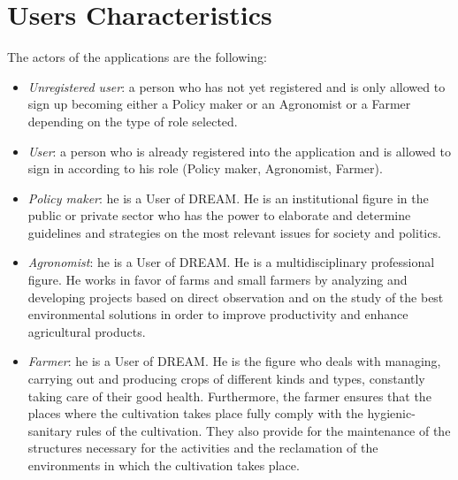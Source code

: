 \section{Users Characteristics}
The actors of the applications are the following:
\begin{itemize}
    \item \textit {Unregistered user}: a person who has not yet registered and is only allowed to sign up becoming either a Policy maker or an Agronomist or a Farmer depending on the type of role selected.
    \item \textit {User}: a person who is already registered into the application and is allowed to sign in according to his role (Policy maker, Agronomist, Farmer).
    \item \textit {Policy maker}: he is a User of DREAM. He is an institutional figure in the public or private sector who has the power to elaborate and determine guidelines and strategies on the most relevant issues for society and politics. 
    \item \textit {Agronomist}: he is a User of DREAM. He is a multidisciplinary professional figure. He works in favor of farms and small farmers by analyzing and developing projects based on direct observation and on the study of the best environmental solutions in order to improve productivity and enhance agricultural products.
    \item \textit {Farmer}: he is a User of DREAM. He is the figure who deals with managing, carrying out and producing crops of different kinds and types, constantly taking care of their good health. Furthermore, the farmer ensures that the places where the cultivation takes place fully comply with the hygienic-sanitary rules of the cultivation. They also provide for the maintenance of the structures necessary for the activities and the reclamation of the environments in which the cultivation takes place.

\end{itemize}